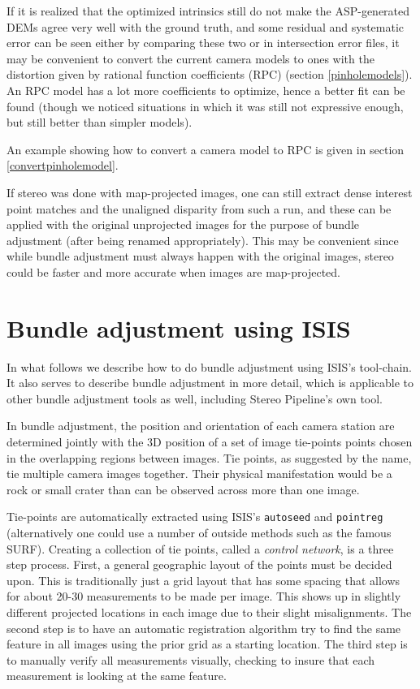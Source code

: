 If it is realized that the optimized intrinsics still do not make the ASP-generated
DEMs agree very well with the ground truth, and some residual and systematic error can be seen
either by comparing these two or in intersection error files, it may be convenient
to convert the current camera models to ones with the distortion given by rational function
coefficients (RPC) (section \ref{pinholemodels}). An RPC model has a lot more
coefficients to optimize, hence a better fit can be found (though we noticed situations 
in which it was still not expressive enough, but still better than simpler models). 

An example showing how to convert a camera model to RPC is given in
section \ref{convertpinholemodel}.

If stereo was done with map-projected images, one can still extract 
dense interest point matches and the unaligned disparity from such a run,
and these can be applied with the original unprojected images for the purpose
of bundle adjustment (after being renamed appropriately). This may be convenient
since while bundle adjustment must always happen with the original images, 
stereo could be faster and more accurate when images are map-projected.

\section{Bundle adjustment using ISIS}

In what follows we describe how to do bundle adjustment using
\ac{ISIS}'s tool-chain. It also serves to describe bundle adjustment in more
detail, which is applicable to other bundle adjustment tools as well,
including Stereo Pipeline's own tool.

In bundle adjustment, the position and orientation of each camera
station are determined jointly with the 3D position of a set of image
tie-points points chosen in the overlapping regions between
images. Tie points, as suggested by the name, tie multiple camera images
together. Their physical manifestation would be a rock or small crater
than can be observed across more than one image.

Tie-points are automatically extracted using \ac{ISIS}'s
\texttt{autoseed} and \texttt{pointreg} (alternatively one could use a
number of outside methods such as the famous SURF\citep{surf08}).
Creating a collection of tie points, called a {\it control network}, is
a three step process. First, a general geographic layout of the points
must be decided upon. This is traditionally just a grid layout that has
some spacing that allows for about 20-30 measurements to be made per
image. This shows up in slightly different projected
locations in each image due to their slight misalignments. The second step
is to have an automatic registration algorithm try to find the same feature
in all images using the prior grid as a starting location. The third
step is to manually verify all measurements visually, checking to insure
that each measurement is looking at the same feature.


